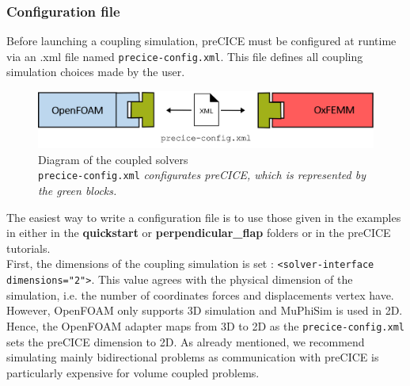 \documentclass[oneside,11pt,times]{book}
\begin{document}
\subsubsection{Configuration file}
Before launching a coupling simulation, preCICE must be configured at runtime via an .xml file named \texttt{precice-config.xml}. This file defines all coupling simulation choices made by the user.\\

\begin{figure}[H]
    \centering
    \includegraphics[width=14cm]{imgs/Illustrations/precice-config.png}
    \caption{Diagram of the coupled solvers\\ \texttt{precice-config.xml} \emph{configurates preCICE, which is represented by the green blocks.}}
    \label{configfile}
\end{figure}

The easiest way to write a configuration file is to use those given in the examples in either in the \textbf{quickstart} or \textbf{perpendicular\_flap} folders or in the preCICE tutorials.\\


First, the dimensions of the coupling simulation is set : \texttt{<solver-interface dimensions="2">}. This value agrees with the physical dimension of the simulation, i.e. the number of coordinates forces and displacements vertex have. However, OpenFOAM only supports 3D simulation and MuPhiSim is used in 2D. Hence, the OpenFOAM adapter maps from 3D to 2D as the \texttt{precice-config.xml} sets the preCICE dimension to 2D. As already mentioned, we recommend simulating mainly bidirectional problems as communication with preCICE is particularly expensive for volume coupled problems.\\
\end{document}
